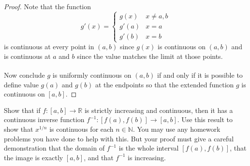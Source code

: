 \documentclass[12pt]{article}
\makeatletter
\theoremstyle{homework}
\newenvironment{exercise}[1]
{\def\@currentlabel{#1}\exercisecore}
{\endexercisecore}
\makeatother
\begin{document}
\begin{enumerate}[(a)]
\begin{proof}
Note that the function $$g'(x)=\begin{cases} g(x) & x\neq a,b\\ g'(a) & x=a\\ g'(b) & x=b\end{cases}$$ is continuous at every point in $(a,b)$ since $g(x)$ is continuous on $(a,b)$ and is continuous at $a$ and $b$ since the value matches the limit at those points.\\\\
Now conclude $g$ is uniformly continuous on $(a, b)$ if and only if it is possible to define value $g(a)$ and $g(b)$ at the endpoints so that the extended function $g$ is continuous on $[a, b]$.
\end{proof}
\end{enumerate}
\begin{exercise} 7
Show that if $f : [a, b] \rightarrow \mathbb{R}$ is strictly increasing and continuous, then it has
a continuous inverse function $f^{-1}: [f(a), f(b)] \rightarrow [a, b]$. Use this result to show that $x^{1/n}$
is
continuous for each $n \in \mathbb{N}$. You may use any homework problems you have done to help
with this. But your proof must give a careful demonstration that the domain of $f^{-1}$
is the
whole interval $[f(a), f(b)]$, that the image is exactly $[a, b]$, and that $f^{-1}$
is increasing.
\end{exercise}
\end{document}
